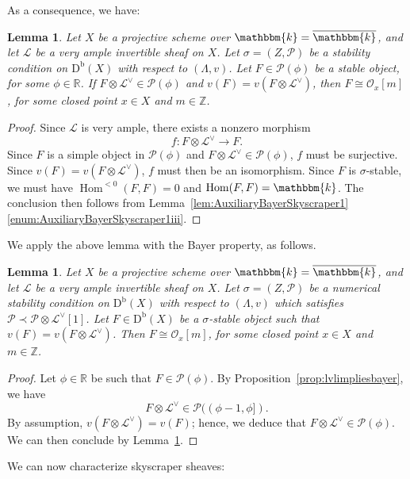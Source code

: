 \documentclass[11pt, reqno]{amsart}
\numberwithin{equation}{section}
\theoremstyle{plain}
\newtheorem{lemma}[theorem]{Lemma}
\theoremstyle{remark}
\theoremstyle{definition}
\theoremstyle{italicsname}
\newcommand{\Db}{\mathrm{D^b}}
\DeclareMathOperator{\Hom}{Hom}
\newcommand{\cO}{\mathcal{O}}
\newcommand{\cL}{\mathcal{L}}
\newcommand{\cP}{\mathscr{P}}
\newcommand{\KK}{\mathbbm{k}}
\def\RR{\ensuremath{\mathbb{R}}}
\def\ZZ{\ensuremath{\mathbb{Z}}}
\begin{document}
As a consequence, we have:

\begin{lemma}\label{lem:AuxiliaryBayerSkyscraper2}
Let $X$ be a projective scheme over $\KK=\overline{\KK}$, and let $\cL$ be a very ample invertible sheaf on $X$.
Let $\sigma=(Z,\cP)$ be a stability condition on $\Db(X)$ with respect to $(\Lambda,v)$.
Let $F\in\cP(\phi)$ be a stable object, for some $\phi\in\RR$.
If $F\otimes\cL^\vee\in\cP(\phi)$ and $v(F)=v(F\otimes\cL^\vee)$, then $F\cong\cO_x[m]$, for some closed point $x\in X$ and $m\in\ZZ$.
\end{lemma}

\begin{proof}
Since $\cL$ is very ample, there exists a nonzero morphism
\[
f\colon F\otimes\cL^\vee\longrightarrow F.
\]
Since $F$ is a simple object in $\cP(\phi)$ and $F\otimes\cL^\vee\in\cP(\phi)$, $f$ must be surjective.
Since $v(F)=v(F\otimes\cL^\vee)$, $f$ must then be an isomorphism.
Since $F$ is $\sigma$-stable, we must have $\Hom^{<0}(F,F)=0$ and $\Hom(F,F)=\KK$.
The conclusion then follows from Lemma~\ref{lem:AuxiliaryBayerSkyscraper1}\ref{enum:AuxiliaryBayerSkyscraper1iii}.
\end{proof}

We apply the above lemma with the Bayer property, as follows.

\begin{lemma}\label{lem:BayerCharacterizeStabilitySkyscraper}
Let $X$ be a projective scheme over $\KK=\overline{\KK}$, and let $\cL$ be a very ample invertible sheaf on $X$.
Let $\sigma=(Z,\cP)$ be a numerical stability condition on $\Db(X)$ with respect to $(\Lambda,v)$ which satisfies 
$\cP\prec\cP\otimes\cL^\vee[1]$. Let $F\in\Db(X)$ be a $\sigma$-stable object such that $v(F)=v(F\otimes\cL^\vee)$.
Then $F\cong\cO_x[m]$, for some closed point $x\in X$ and $m\in\ZZ$.
\end{lemma}

\begin{proof}
Let $\phi\in\RR$ be such that $F\in\cP(\phi)$.
By Proposition~\ref{prop:lvlimpliesbayer}, we have
\[
F\otimes\cL^\vee\in\cP((\phi-1,\phi]).
\]
By assumption, $v(F\otimes\cL^\vee)=v(F)$; hence, we deduce that $F\otimes\cL^\vee\in\cP(\phi)$.
We can then conclude by Lemma~\ref{lem:AuxiliaryBayerSkyscraper2}.
\end{proof}

We can now characterize skyscraper sheaves:
\end{document}

